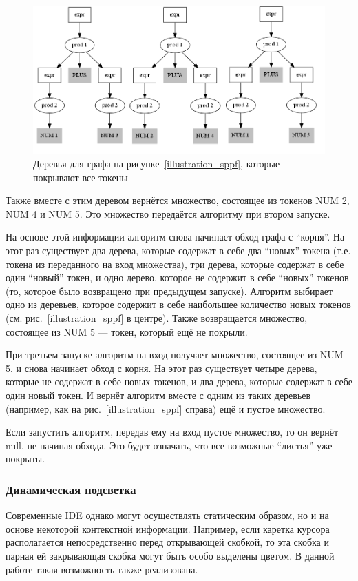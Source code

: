 \begin{figure}[t]
    \centering
    \includegraphics[width=\linewidth]{Ivanov/Pictures/illustration_forest.png}
    \caption{Деревья для графа на рисунке~\ref{illustration_sppf}, которые покрывают все токены}
    \label{forest}
\end{figure}

Также вместе с этим деревом вернётся множество, состоящее из токенов NUM 2, NUM 4 и NUM 5. Это множество передаётся алгоритму при втором запуске. 

На основе этой информации алгоритм снова начинает обход графа с ``корня''. На этот раз существует два дерева, которые содержат в себе два ``новых'' токена (т.е. токена из переданного на вход множества), три дерева, которые содержат в себе один ``новый'' токен, и одно дерево, которое не содержит в себе ``новых'' токенов (то, которое было возвращено при предыдущем запуске). Алгоритм выбирает одно из деревьев, которое содержит в себе наибольшее количество новых токенов (см. рис.~\ref{illustration_sppf} в центре). Также возвращается множество, состоящее из NUM 5 --- токен, который ещё не покрыли. 

При третьем запуске алгоритм на вход получает множество, состоящее из NUM 5, и снова начинает обход с корня. На этот раз существует четыре дерева, которые не содержат в себе новых токенов, и два дерева, которые содержат в себе один новый токен. И вернёт алгоритм вместе с одним из таких деревьев (например, как на рис.~\ref{illustration_sppf} справа) ещё и пустое множество.

Если запустить алгоритм, передав ему на вход пустое множество, то он вернёт null, не начиная обхода. Это будет означать, что все возможные ``листья'' уже покрыты. 
\subsubsection{Динамическая подсветка}
Современные IDE однако могут осуществлять статическим образом, но и на основе некоторой контекстной информации. Например, если каретка курсора располагается непосредственно перед открывающей скобкой, то эта скобка и парная ей закрывающая скобка могут быть особо выделены цветом. В данной работе такая возможность также реализована. 

